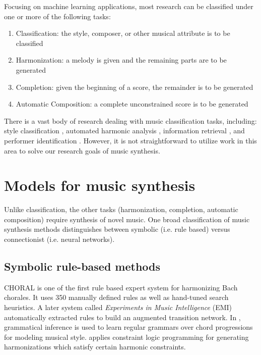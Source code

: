 \documentclass[dissertation.tex]{subfiles}
\begin{document}
Focusing on machine learning applications, most research can be
classified under one or more of the following tasks:
\begin{enumerate}
  \item Classification: the style, composer, or other musical attribute is to be classified
  \item Harmonization: a melody is given and the remaining parts are to be generated
  \item Completion: given the beginning of a score, the remainder is to be generated
  \item Automatic Composition: a complete unconstrained score is to be generated
\end{enumerate}

There is a vast body of research dealing with music classification tasks,
including: style classification \cite{Herlands2014}
\cite{dannenberg1997machine}, automated harmonic analysis \cite{ni2012end},
information retrieval \cite{mandel2006support}, and performer identification
\cite{stamatatos2005automatic}. However, it is not straightforward to utilize
work in this area to solve our research goals of music synthesis.

\section{Models for music synthesis}

Unlike classification, the other tasks (harmonization, completion, automatic
composition) require synthesis of novel music. One broad classification of
music synthesis methods \cite{toiviainen2000symbolic} distinguishes between
symbolic (i.e. rule based) versus connectionist (i.e. neural networks).

\subsection{Symbolic rule-based methods}

CHORAL \cite{ebciouglu1988expert} is one of the first rule based expert system
for harmonizing Bach chorales. It uses 350 manually defined rules as well as
hand-tuned search heuristics. A later system called \emph{Experiments in Music
Intelligence} (EMI) \cite{cope1992computer} automatically extracted rules to
build an augmented transition network\cite{wanner1980atn}. In
\cite{cruz1998learning}, grammatical inference is used to learn regular
grammars over chord progressions for modeling musical style.
\cite{tsang1991harmonizing} applies constraint logic programming for generating
harmonizations which satisfy certain harmonic constraints.
\end{document}
